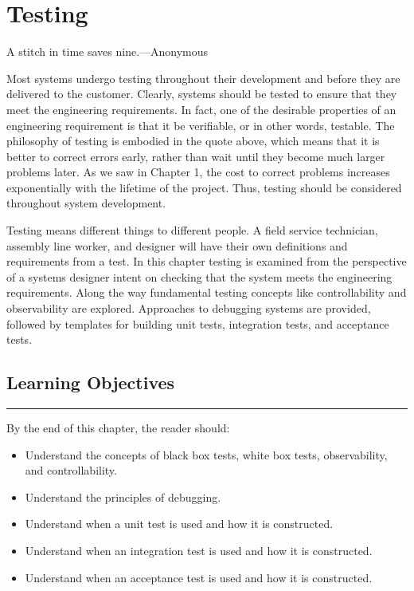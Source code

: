 \chapter{Testing}
\graphicspath{ {./chapter07/Fig} }

\begin{itquote}
A stitch in time saves nine.---Anonymous
\end{itquote}


Most systems undergo testing throughout their development and before
they are delivered to the customer. Clearly, systems should be tested to
ensure that they meet the engineering requirements. In fact, one of the
desirable properties of an engineering requirement is that it be
verifiable, or in other words, testable. The philosophy of testing is
embodied in the quote above, which means that it is better to correct
errors early, rather than wait until they become much larger problems
later. As we saw in Chapter 1, the cost to correct problems increases
exponentially with the lifetime of the project. Thus, testing should be
considered throughout system development.

Testing means different things to different people. A field service
technician, assembly line worker, and designer will have their own
definitions and requirements from a test. In this chapter testing is
examined from the perspective of a systems designer intent on checking
that the system meets the engineering requirements. Along the way
fundamental testing concepts like controllability and observability are
explored. Approaches to debugging systems are provided, followed by
templates for building unit tests, integration tests, and acceptance
tests.

\section*{Learning Objectives}
\noindent\rule{\linewidth}{1pt}
By the end of this chapter, the reader should:

\begin{itemize}
\item
  Understand the concepts of black box tests, white box tests,
  observability, and controllability.
\item
  Understand the principles of debugging.
\item
  Understand when a unit test is used and how it is constructed.
\item
  Understand when an integration test is used and how it is constructed.
\item
  Understand when an acceptance test is used and how it is constructed.
\end{itemize}

